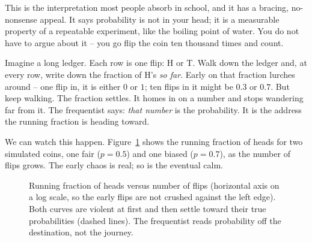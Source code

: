 This is the interpretation most people absorb in school, and it has a bracing,
no-nonsense appeal. It says probability is not in your head; it is a measurable
property of a repeatable experiment, like the boiling point of water. You do not
have to argue about it -- you go flip the coin ten thousand times and count.

\begin{intuitionbox}
Imagine a long ledger. Each row is one flip: H or T. Walk down the ledger and, at
every row, write down the fraction of H's \emph{so far}. Early on that fraction
lurches around -- one flip in, it is either $0$ or $1$; ten flips in it might be
$0.3$ or $0.7$. But keep walking. The fraction settles. It homes in on a number
and stops wandering far from it. The frequentist says: \emph{that number} is the
probability. It is the address the running fraction is heading toward.
\end{intuitionbox}

We can watch this happen. Figure~\ref{ch01:fig-stabilize} shows the running
fraction of heads for two simulated coins, one fair ($p = 0.5$) and one biased
($p = 0.7$), as the number of flips grows. The early chaos is real; so is the
eventual calm.

\begin{figure}[H]
\centering
{}
\caption{Running fraction of heads versus number of flips (horizontal axis on a
log scale, so the early flips are not crushed against the left edge). Both curves
are violent at first and then settle toward their true probabilities (dashed
lines). The frequentist reads probability off the destination, not the journey.}
\label{ch01:fig-stabilize}
\end{figure}

